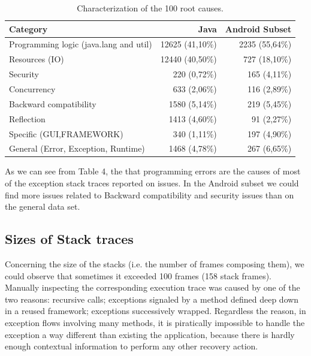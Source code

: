 \documentclass[conference]{IEEEtran}
\begin{document}
\begin{table}
  \centering
  \begin{tabular}{lrr}
    \hline
    \bfseries{Category} & \bfseries{Java} & \bfseries{Android Subset} \\
    \hline
      Programming logic (java.lang and util) & 12625  (41,10\%) & 2235 (55,64\%)\\
      Resources (IO)                         & 12440 (40,50\%)  & 727 (18,10\%) \\
      Security                               & 220  (0,72\%)    & 165 (4,11\%)\\
      Concurrency                            & 633 (2,06\%)     & 116  (2,89\%)\\
      Backward compatibility                 & 1580 (5,14\%)    & 219 (5,45\%) \\
      Reflection                             & 1413 (4,60\%)    & 91 (2,27\%)\\
      Specific (GUI,FRAMEWORK)               & 340 (1,11\%)     & 197 (4,90\%)\\
      General (Error, Exception, Runtime)    & 1468 (4,78\%)    & 267 (6,65\%)\\
    \hline
  \end{tabular}
  \caption{Characterization of the 100 root causes.}
  \label{tab:tophundrend}
\end{table}

As we can see from Table 4, the that programming errors are the causes of most
of the exception stack traces reported on issues. In the Android subset we could
find more issues related to Backward compatibility and security issues than on
the general data set.

\subsection{Sizes of Stack traces}

Concerning the size of the stacks (i.e. the number of frames composing them), we
could observe that  sometimes it exceeded 100 frames (158 stack frames).
Manually inspecting the corresponding execution trace was caused by one of the
two reasons: recursive calls; exceptions signaled by a method defined deep down
in a reused framework; exceptions successively wrapped. Regardless the reason,
in exception flows involving many methods, it is piratically impossible to
handle the exception a way different than existing the  application, because
there is hardly enough contextual information to perform any other recovery
action.
\end{document}
